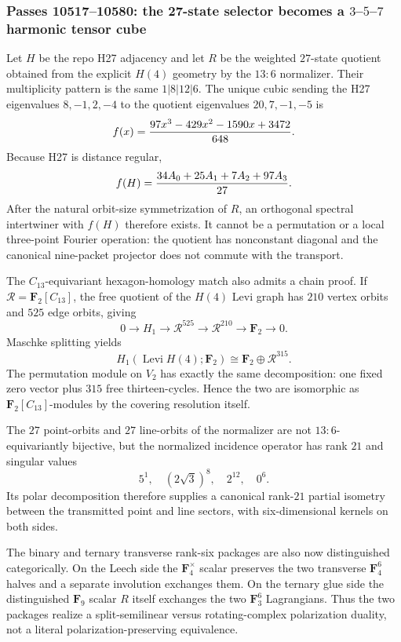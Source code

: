\subsubsection*{Passes 10517--10580: the 27-state selector becomes a $3$--$5$--$7$ harmonic tensor cube}
Let $H$ be the repo H27 adjacency and let $R$ be the weighted $27$-state quotient
obtained from the explicit $H(4)$ geometry by the $13{:}6$ normalizer.  Their
multiplicity pattern is the same $1|8|12|6$.  The unique cubic sending the H27
eigenvalues $8,-1,2,-4$ to the quotient eigenvalues $20,7,-1,-5$ is
\[
 f(x)={97x^3-429x^2-1590x+3472\over648}.
\]
Because H27 is distance regular,
\[
 f(H)={34A_0+25A_1+7A_2+97A_3\over27}.
\]
After the natural orbit-size symmetrization of $R$, an orthogonal spectral
intertwiner with $f(H)$ therefore exists.  It cannot be a permutation or a
local three-point Fourier operation: the quotient has nonconstant diagonal and
the canonical nine-packet projector does not commute with the transport.

The $C_{13}$-equivariant hexagon-homology match also admits a chain proof.  If
$\mathcal R=\mathbf F_2[C_{13}]$, the free quotient of the $H(4)$ Levi graph has
$210$ vertex orbits and $525$ edge orbits, giving
\[
 0\to H_1\to\mathcal R^{525}\to\mathcal R^{210}\to\mathbf F_2\to0.
\]
Maschke splitting yields
\[
 \boxed{H_1(\operatorname{Levi}H(4);\mathbf F_2)
 \cong \mathbf F_2\oplus\mathcal R^{315}}.
\]
The permutation module on $V_2$ has exactly the same decomposition: one fixed
zero vector plus $315$ free thirteen-cycles.  Hence the two are isomorphic as
$\mathbf F_2[C_{13}]$-modules by the covering resolution itself.

The $27$ point-orbits and $27$ line-orbits of the normalizer are not
$13{:}6$-equivariantly bijective, but the normalized incidence operator has
rank $21$ and singular values
\[
 5^1,\quad(2\sqrt3)^8,\quad2^{12},\quad0^6.
\]
Its polar decomposition therefore supplies a canonical rank-$21$ partial
isometry between the transmitted point and line sectors, with six-dimensional
kernels on both sides.

The binary and ternary transverse rank-six packages are also now distinguished
categorically.  On the Leech side the $\mathbf F_4^\times$ scalar preserves the
two transverse $\mathbf F_4^6$ halves and a separate involution exchanges them.
On the ternary glue side the distinguished $\mathbf F_9$ scalar $R$ itself
exchanges the two $\mathbf F_3^6$ Lagrangians.  Thus the two packages realize a
split-semilinear versus rotating-complex polarization duality, not a literal
polarization-preserving equivalence.

